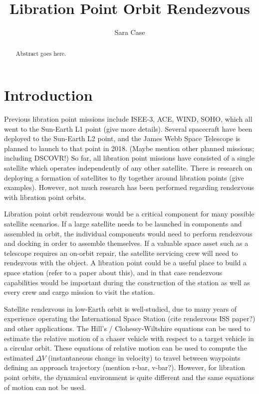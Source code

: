 \documentclass[]{article}
\title{Libration Point Orbit Rendezvous}
\author{Sara Case}
\begin{document}
\maketitle

\begin{abstract}
	
	Abstract goes here.

\end{abstract}

\section{Introduction}

Previous libration point missions include ISEE-3, ACE, WIND, SOHO, which all went to the Sun-Earth L1 point (give more details).  Several spacecraft have been deployed to the Sun-Earth L2 point, and the James Webb Space Telescope is planned to launch to that point in 2018.  (Maybe mention other planned missions; including DSCOVR!)  So far, all libration point missions have consisted of a single satellite which operates independently of any other satellite.  There is research on deploying a formation of satellites to fly together around libration points (give examples).  However, not much research has been performed regarding rendezvous with libration point orbits.

Libration point orbit rendezvous would be a critical component for many possible satellite scenarios.  If a large satellite needs to be launched in components and assembled in orbit, the individual components would need to perform rendezvous and docking in order to assemble themselves.  If a valuable space asset such as a telescope requires an on-orbit repair, the satellite servicing crew will need to rendezvous with the object.  A libration point could be a useful place to build a space station (refer to a paper about this), and in that case rendezvous capabilities would be important during the construction of the station as well as every crew and cargo mission to visit the station.

Satellite rendezvous in low-Earth orbit is well-studied, due to many years of experience operating the International Space Station (cite rendezvous ISS paper?) and other applications.  The Hill's / Clohessy-Wiltshire equations can be used to estimate the relative motion of a chaser vehicle with respect to a target vehicle in a circular orbit.  These equations of relative motion can be used to compute the estimated \(\Delta V\) (instantaneous change in velocity) to travel between waypoints defining an approach trajectory (mention r-bar, v-bar?).  However, for libration point orbits, the dynamical environment is quite different and the same equations of motion can not be used.
\end{document}
